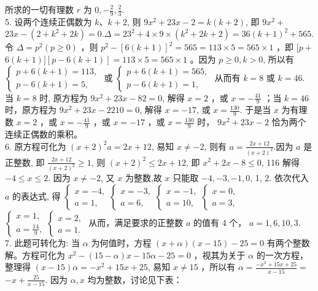 \documentclass[10pt]{article}
\begin{document}
所求的一切有理数 $r$ 为 $0,-\frac{2}{9}, \frac{2}{3}$.\\
5. 设两个连续正偶数为 $k 、 k+2$, 则 $9 x^{2}+23 x-2=k(k+2)$, 即 $9 x^{2}+$ $23 x-\left(2+k^{2}+2 k\right)=0 . \Delta=23^{2}+4 \times 9 \times\left(k^{2}+2 k+2\right)=36(k+1)^{2}+565$.令 $\Delta=p^{2}(p \geqslant 0)$ ，则 $p^{2}-[6(k+1)]^{2}=565=113 \times 5=565 \times 1$ ，即 $[p+$ $6(k+1)][p-6(k+1)]=113 \times 5=565 \times 1$ 。因为 $p \geqslant 0, k>0$, 所以有 $\left\{\begin{array}{l}p+6(k+1)=113, \\ p-6(k+1)=5,\end{array}\right.$ 或 $\left\{\begin{array}{l}p+6(k+1)=565, \\ p-6(k+1)=1,\end{array}\right.$ 从而有 $k=8$ 或 $k=46$. 当 $k=8$ 时, 原方程为 $9 x^{2}+23 x-82=0$, 解得 $x=2$ ，或 $x=-\frac{41}{9}$ ；当 $k=46$ 时，原方程为 $9 x^{2}+23 x-2210=0$, 解得 $x=-17$, 或 $x=\frac{130}{9}$. 于是当 $x$ 为有理数 $x=2$ ，或 $x=-\frac{41}{9}$ ，或 $x=-17$ ，或 $x=\frac{130}{9}$ 时， $9 x^{2}+23 x-2$ 恰为两个连续正偶数的乘积。\\
6. 原方程可化为 $(x+2)^{2} a=2 x+12$, 易知 $x \neq-2$, 则有 $a=\frac{2 x+12}{(x+2)^{2}}$.因为 $a$ 是正整数, 即 $\frac{2 x+12}{(x+2)^{2}} \geqslant 1$, 则 $(x+2)^{2} \leqslant 2 x+12$, 即 $x^{2}+2 x-8 \leqslant 0$, 116 解得 $-4 \leqslant x \leqslant 2$. 因为 $x \neq-2$, 又 $x$ 为整数,故 $x$ 只能取 $-4,-3,-1,0$, 1, 2. 依次代入 $a$ 的表达式, 得 $\left\{\begin{array}{l}x=-4, \\ a=1,\end{array}\left\{\begin{array}{l}x=-3, \\ a=6,\end{array}\left\{\begin{array}{l}x=-1, \\ a=10,\end{array}\left\{\begin{array}{l}x=0, \\ a=3,\end{array}\right.\right.\right.\right.$ $\left\{\begin{array}{l}x=1, \\ a=\frac{14}{9},\end{array}\left\{\begin{array}{l}x=2, \\ a=1 .\end{array}\right.\right.$ 从而，满足要求的正整数 $a$ 的值有 4 个， $a=1,6,10,3$.\\
7. 此题可转化为: 当 $\alpha$ 为何值时，方程 $(x+\alpha)(x-15)-25=0$ 有两个整数解。方程可化为 $x^{2}-(15-\alpha) x-15 \alpha-25=0$ ，视其为关于 $\alpha$ 的一次方程，整理得 $(x-15) \alpha=-x^{2}+15 x+25$, 易知 $x \neq 15$ ，所以有 $\alpha=\frac{-x^{2}+15 x+25}{x-15}=$ $-x+\frac{25}{x-15}$. 因为 $\alpha, x$ 均为整数，讨论见下表：
\end{document}
